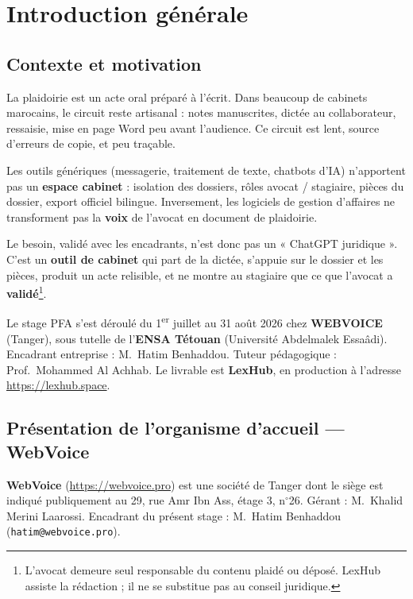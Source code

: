 \chapter{Introduction générale}
\label{ch:intro}

\section{Contexte et motivation}

La plaidoirie est un acte oral préparé à l'écrit. Dans beaucoup de cabinets marocains, le circuit reste artisanal : notes manuscrites, dictée au collaborateur, ressaisie, mise en page Word peu avant l'audience. Ce circuit est lent, source d'erreurs de copie, et peu traçable.

Les outils génériques (messagerie, traitement de texte, chatbots d'IA) n'apportent pas un \textbf{espace cabinet} : isolation des dossiers, rôles avocat / stagiaire, pièces du dossier, export officiel bilingue. Inversement, les logiciels de gestion d'affaires ne transforment pas la \textbf{voix} de l'avocat en document de plaidoirie.

Le besoin, validé avec les encadrants, n'est donc pas un « ChatGPT juridique ». C'est un \textbf{outil de cabinet} qui part de la dictée, s'appuie sur le dossier et les pièces, produit un acte relisible, et ne montre au stagiaire que ce que l'avocat a \textbf{validé}\footnote{L'avocat demeure seul responsable du contenu plaidé ou déposé. LexHub assiste la rédaction ; il ne se substitue pas au conseil juridique.}.

Le stage PFA s'est déroulé du 1\textsuperscript{er} juillet au 31 août 2026 chez \textbf{WEBVOICE} (Tanger), sous tutelle de l'\textbf{ENSA Tétouan} (Université Abdelmalek Essaâdi). Encadrant entreprise : M.~Hatim Benhaddou. Tuteur pédagogique : Prof.~Mohammed Al Achhab. Le livrable est \textbf{LexHub}, en production à l'adresse \url{https://lexhub.space}.

\section{Présentation de l'organisme d'accueil --- WebVoice}
\label{sec:webvoice}

\textbf{WebVoice} (\url{https://webvoice.pro}) est une société de Tanger dont le siège est indiqué publiquement au 29, rue Amr Ibn Ass, étage 3, n$^\circ$26. Gérant : M.~Khalid Merini Laarossi. Encadrant du présent stage : M.~Hatim Benhaddou (\texttt{hatim@webvoice.pro}).

